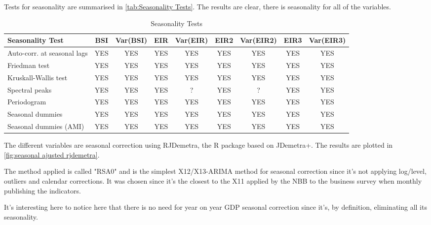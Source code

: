\documentclass[12pt,a4paper,oneside]{book}
\begin{document}
Tests for seasonality are summarised in \autoref{tab:Seasonality Tests}. The results are clear, there is seasonality for all of the variables.

\begin{table}[htp!]
    \centering \footnotesize
    \begin{tabular}{l|c|c|c|c|c|c|c|c}
\textbf{Seasonality Test} & BSI & Var(BSI) & EIR & Var(EIR) & EIR2 & Var(EIR2) & EIR3 & Var(EIR3) \\ \hline
Auto-corr. at seasonal lags& YES & YES & YES & YES & YES & YES & YES & YES \\
Friedman test       & YES   & YES & YES & YES & YES & YES & YES & YES \\
Kruskall-Wallis test & YES   & YES & YES & YES & YES & YES & YES & YES \\
Spectral peaks                  & YES   & YES & YES & ? & YES & ? & YES & YES \\
Periodogram                     & YES   & YES & YES & YES & YES & YES & YES & YES \\
Seasonal dummies                & YES   & YES & YES & YES & YES & YES & YES & YES \\
Seasonal dummies (AMI)          & YES   & YES & YES & YES & YES & YES & YES & YES \\
    \end{tabular}
    \caption{Seasonality Tests}
    \label{tab:Seasonality Tests}
\end{table}



The different variables are seasonal correction using RJDemetra, the R package based on JDemetra+.
The results are plotted in \autoref{fig:seasonal ajusted rjdemetra}.

The method applied is called "RSA0" and is the simplest X12/X13-ARIMA method for seasonal correction since it's not applying log/level, outliers and calendar corrections. 
It was chosen since it's the closest to the X11 applied by the NBB to the business survey when monthly publishing the indicators.

It's interesting here to notice here that there is no need for year on year GDP seasonal correction since it's, by definition, eliminating all its seasonality.
\end{document}

